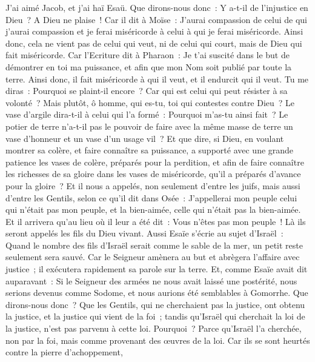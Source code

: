 \begin{multicols}{2}
J'ai aimé Jacob, et j'ai haï Esaü.
Que dirons-nous donc~: Y a-t-il de l'injustice en Dieu~? A Dieu ne plaise~!
Car il dit à Moïse~: J'aurai compassion de celui de qui j'aurai compassion et je ferai miséricorde à celui à qui je ferai miséricorde.
Ainsi donc, cela ne vient pas de celui qui veut, ni de celui qui court, mais de Dieu qui fait miséricorde.
Car l'Ecriture dit à Pharaon~: Je t'ai suscité dans le but de démontrer en toi ma puissance, et afin que mon Nom soit publié par toute la terre.
Ainsi donc, il fait miséricorde à qui il veut, et il endurcit qui il veut.
Tu me diras~: Pourquoi se plaint-il encore~? Car qui est celui qui peut résister à sa volonté~?
Mais plutôt, ô homme, qui es-tu, toi qui contestes contre Dieu~? Le vase d'argile dira-t-il à celui qui l'a formé~: Pourquoi m'as-tu ainsi fait~?
Le potier de terre n'a-t-il pas le pouvoir de faire avec la même masse de terre un vase d'honneur et un vase d'un usage vil~?
Et que dire, si Dieu, en voulant montrer sa colère, et faire connaître sa puissance, a supporté avec une grande patience les vases de colère, préparés pour la perdition,
et afin de faire connaître les richesses de sa gloire dans les vases de miséricorde, qu'il a préparés d'avance pour la gloire~?
Et il nous a appelés, non seulement d'entre les juifs, mais aussi d'entre les Gentils,
selon ce qu'il dit dans Osée~: J'appellerai mon peuple celui qui n'était pas mon peuple, et la bien-aimée, celle qui n'était pas la bien-aimée.
Et il arrivera qu'au lieu où il leur a été dit~: Vous n'êtes pas mon peuple~! Là ils seront appelés les fils du Dieu vivant.
Aussi Esaïe s'écrie au sujet d'Israël~: Quand le nombre des fils d'Israël serait comme le sable de la mer, un petit reste seulement sera sauvé.
Car le Seigneur amènera au but et abrègera l'affaire avec justice~; il exécutera rapidement sa parole sur la terre.
Et, comme Esaïe avait dit auparavant~: Si le Seigneur des armées ne nous avait laissé une postérité, nous serions devenus comme Sodome, et nous aurions été semblables à Gomorrhe.
Que dirons-nous donc~? Que les Gentils, qui ne cherchaient pas la justice, ont obtenu la justice, et la justice qui vient de la foi~;
tandis qu'Israël qui cherchait la loi de la justice, n'est pas parvenu à cette loi.
Pourquoi~? Parce qu'Israël l'a cherchée, non par la foi, mais comme provenant des œuvres de la loi. Car ils se sont heurtés contre la pierre d'achoppement,

\end{multicols}
